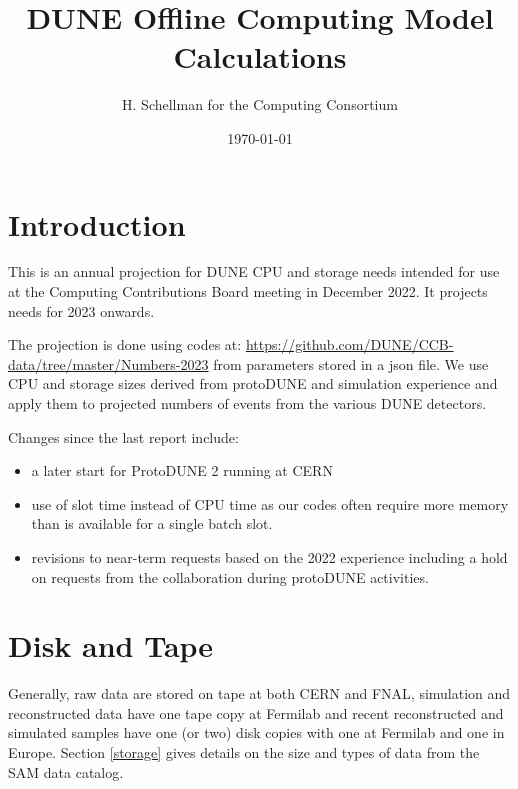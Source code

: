 \documentclass[12pt]{article}
\title{DUNE Offline Computing Model Calculations}
\author{H. Schellman for the Computing Consortium}
\date{\today}
\begin{document}
\makeatletter
{}
\makeatother
\newcommand{\csvautotabularright}[2][]{\csvloop{autotabularright={#2},#1}}

\maketitle
\section{Introduction}

This is an annual projection for DUNE CPU and storage needs intended for use at the Computing Contributions Board meeting in December 2022. It projects needs for 2023 onwards. 

The projection is done using codes at: \href{https://github.com/DUNE/CCB-data/tree/master/Numbers-2023}{https://github.com/DUNE/CCB-data/tree/master/Numbers-2023} from parameters stored in a json file. We use CPU and storage sizes derived from protoDUNE and simulation experience and apply them to projected numbers of events from the various DUNE detectors. 

Changes since the last report include:

\begin{itemize}
\item a later start for ProtoDUNE 2 running at CERN
\item use of slot time instead of CPU time as our codes often require more memory than is available for a single batch slot. 
\item revisions to near-term requests based on the 2022 experience including a hold on requests from the collaboration during protoDUNE activities. 
\end{itemize}


\section{Disk and Tape}

Generally, raw data are stored on tape at both CERN and FNAL, simulation and reconstructed data  have one tape copy at Fermilab and recent reconstructed and simulated samples have one (or two) disk copies with one at Fermilab and one in Europe.  Section \ref{storage} gives details on the size and types of data from the SAM data catalog.
\end{document}
